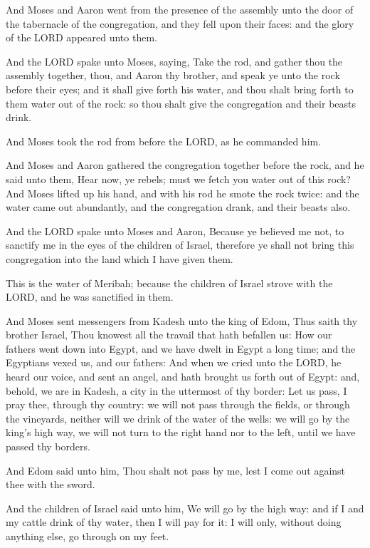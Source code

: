 \verse And Moses and Aaron went from the presence of the assembly unto
the door of the tabernacle of the congregation, and they fell upon
their faces: and the glory of the LORD appeared unto them.

\verse And the LORD spake unto Moses, saying, \verse Take the rod, and
gather thou the assembly together, thou, and Aaron thy brother, and
speak ye unto the rock before their eyes; and it shall give forth his
water, and thou shalt bring forth to them water out of the rock: so
thou shalt give the congregation and their beasts drink.

\verse And Moses took the rod from before the LORD, as he commanded him.

\verse And Moses and Aaron gathered the congregation together before
the rock, and he said unto them, Hear now, ye rebels; must we fetch
you water out of this rock?  \verse And Moses lifted up his hand, and
with his rod he smote the rock twice: and the water came out
abundantly, and the congregation drank, and their beasts also.

\verse And the LORD spake unto Moses and Aaron, Because ye believed me
not, to sanctify me in the eyes of the children of Israel, therefore
ye shall not bring this congregation into the land which I have given
them.

\verse This is the water of Meribah; because the children of Israel
strove with the LORD, and he was sanctified in them.

\verse And Moses sent messengers from Kadesh unto the king of Edom,
Thus saith thy brother Israel, Thou knowest all the travail that hath
befallen us: \verse How our fathers went down into Egypt, and we have
dwelt in Egypt a long time; and the Egyptians vexed us, and our
fathers: \verse And when we cried unto the LORD, he heard our voice,
and sent an angel, and hath brought us forth out of Egypt: and,
behold, we are in Kadesh, a city in the uttermost of thy border: \verse
Let us pass, I pray thee, through thy country: we will not pass
through the fields, or through the vineyards, neither will we drink of
the water of the wells: we will go by the king's high way, we will not
turn to the right hand nor to the left, until we have passed thy
borders.

\verse And Edom said unto him, Thou shalt not pass by me, lest I come
out against thee with the sword.

\verse And the children of Israel said unto him, We will go by the high
way: and if I and my cattle drink of thy water, then I will pay for
it: I will only, without doing anything else, go through on my feet.

